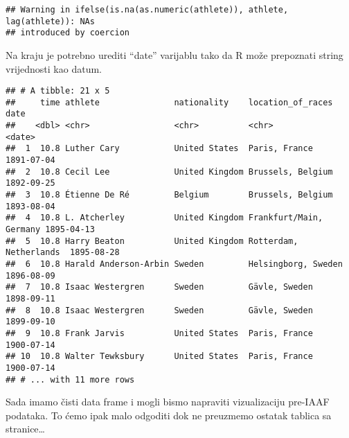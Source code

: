 \documentclass[
]{article}
\newenvironment{Shaded}{\begin{snugshade}}{\end{snugshade}}
\newcommand{\CommentTok}[1]{\textcolor[rgb]{0.56,0.35,0.01}{\textit{#1}}}
\newcommand{\DataTypeTok}[1]{\textcolor[rgb]{0.13,0.29,0.53}{#1}}
\newcommand{\KeywordTok}[1]{\textcolor[rgb]{0.13,0.29,0.53}{\textbf{#1}}}
\newcommand{\NormalTok}[1]{#1}
\newcommand{\OperatorTok}[1]{\textcolor[rgb]{0.81,0.36,0.00}{\textbf{#1}}}
\newcommand{\StringTok}[1]{\textcolor[rgb]{0.31,0.60,0.02}{#1}}
\begin{document}
\begin{verbatim}
## Warning in ifelse(is.na(as.numeric(athlete)), athlete, lag(athlete)): NAs
## introduced by coercion
\end{verbatim}

Na kraju je potrebno urediti ``date'' varijablu tako da R može
prepoznati string vrijednosti kao datum.

\begin{Shaded}
\end{Shaded}

\begin{verbatim}
## # A tibble: 21 x 5
##     time athlete               nationality    location_of_races       date      
##    <dbl> <chr>                 <chr>          <chr>                   <date>    
##  1  10.8 Luther Cary           United States  Paris, France           1891-07-04
##  2  10.8 Cecil Lee             United Kingdom Brussels, Belgium       1892-09-25
##  3  10.8 Étienne De Ré         Belgium        Brussels, Belgium       1893-08-04
##  4  10.8 L. Atcherley          United Kingdom Frankfurt/Main, Germany 1895-04-13
##  5  10.8 Harry Beaton          United Kingdom Rotterdam, Netherlands  1895-08-28
##  6  10.8 Harald Anderson-Arbin Sweden         Helsingborg, Sweden     1896-08-09
##  7  10.8 Isaac Westergren      Sweden         Gävle, Sweden           1898-09-11
##  8  10.8 Isaac Westergren      Sweden         Gävle, Sweden           1899-09-10
##  9  10.8 Frank Jarvis          United States  Paris, France           1900-07-14
## 10  10.8 Walter Tewksbury      United States  Paris, France           1900-07-14
## # ... with 11 more rows
\end{verbatim}

Sada imamo čisti data frame i mogli bismo napraviti vizualizaciju
pre-IAAF podataka. To ćemo ipak malo odgoditi dok ne preuzmemo ostatak
tablica sa stranice\ldots{}
\end{document}
